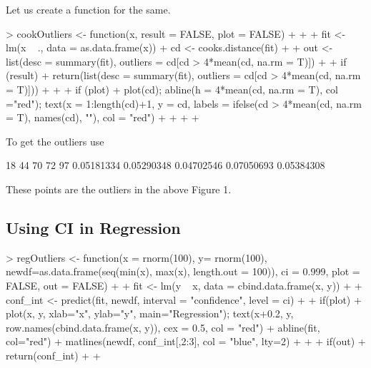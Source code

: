 \documentclass{article}
\begin{document}
Let us create a function for the same. 

\begin{leftbar}
\begin{Schunk}
\begin{Sinput}
> cookOutliers <- function(x, result = FALSE, plot = FALSE){
+   
+   
+   fit <- lm(x ~ ., data = as.data.frame(x))
+   cd <- cooks.distance(fit)
+   
+   out <- list(desc = summary(fit), outliers = cd[cd > 4*mean(cd, na.rm = T)])
+   
+   if (result){
+     return(list(desc = summary(fit), outliers = cd[cd > 4*mean(cd, na.rm = T)]))
+   } 
+   
+  if (plot){
+    plot(cd); abline(h = 4*mean(cd, na.rm = T), col ="red"); text(x = 1:length(cd)+1, y = cd, labels = ifelse(cd > 4*mean(cd, na.rm = T), names(cd), ""), col = "red")
+    
+  }
+    
+ }
\end{Sinput}
\end{Schunk}
\end{leftbar}

To get the outliers use

\begin{Schunk}
\begin{Soutput}
        18         44         70         72         97 
0.05181334 0.05290348 0.04702546 0.07050693 0.05384308 
\end{Soutput}
\end{Schunk}

These points are the outliers in the above Figure 1. 

\subsection{Using CI in Regression}

\begin{leftbar}
\begin{Schunk}
\begin{Sinput}
> regOutliers <- function(x = rnorm(100), y= rnorm(100), newdf=as.data.frame(seq(min(x), max(x), length.out = 100)), ci = 0.999, plot = FALSE, out = FALSE){
+   
+   fit <- lm(y ~ x, data = cbind.data.frame(x, y))
+   
+   conf_int <- predict(fit, newdf, interval = "confidence", level = ci)
+   
+   if(plot){
+     plot(x, y, xlab="x", ylab="y", main="Regression"); text(x+0.2, y, row.names(cbind.data.frame(x, y)), cex = 0.5, col = "red")
+     abline(fit, col="red")
+     matlines(newdf, conf_int[,2:3], col = "blue", lty=2)
+     
+   }
+   if(out){
+     return(conf_int)
+   }
+ }
\end{Sinput}
\end{Schunk}
\end{leftbar}
\end{document}
